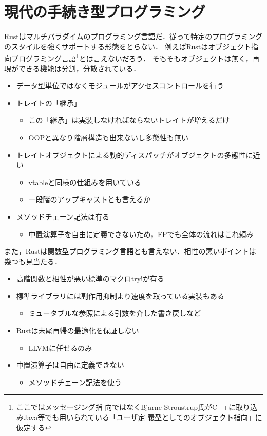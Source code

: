 \section{現代の手続き型プログラミング}
Rustはマルチパラダイムのプログラミング言語だ．従って特定のプログラミングのスタイルを強くサポートする形態をとらない．
例えばRustはオブジェクト指向プログラミング言語\footnote{ここではメッセージング指
  向ではなくBjarne Stroustrup氏がC++に取り込みJava等でも用いられている「ユーザ定
  義型としてのオブジェクト指向」に仮定する}とは言えないだろう．
そもそもオブジェクトは無く，再現ができる機能は分割，分散されている．
\begin{itemize}
\item データ型単位ではなくモジュールがアクセスコントロールを行う
\item トレイトの「継承」
  \begin{itemize}
  \item この「継承」は実装しなければならないトレイトが増えるだけ
  \item OOPと異なり階層構造も出来ないし多態性も無い
  \end{itemize}
\item トレイトオブジェクトによる動的ディスパッチがオブジェクトの多態性に近い
  \begin{itemize}
  \item vtableと同様の仕組みを用いている
  \item 一段階のアップキャストとも言えるか
  \end{itemize}
\item メソッドチェーン記法は有る
  \begin{itemize}
  \item 中置演算子を自由に定義できないため，FPでも全体の流れはこれ頼み
  \end{itemize}
\end{itemize}
また，Rustは関数型プログラミング言語とも言えない．相性の悪いポイントは幾つも見当たる．
\begin{itemize}
\item 高階関数と相性が悪い標準のマクロtry!が有る
\item 標準ライブラリには副作用抑制より速度を取っている実装もある
  \begin{itemize}
  \item ミュータブルな参照による引数を介した書き戻しなど
  \end{itemize}
\item Rustは末尾再帰の最適化を保証しない
  \begin{itemize}
  \item LLVMに任せるのみ
  \end{itemize}
\item 中置演算子は自由に定義できない
  \begin{itemize}
  \item メソッドチェーン記法を使う
  \end{itemize}
\end{itemize}

